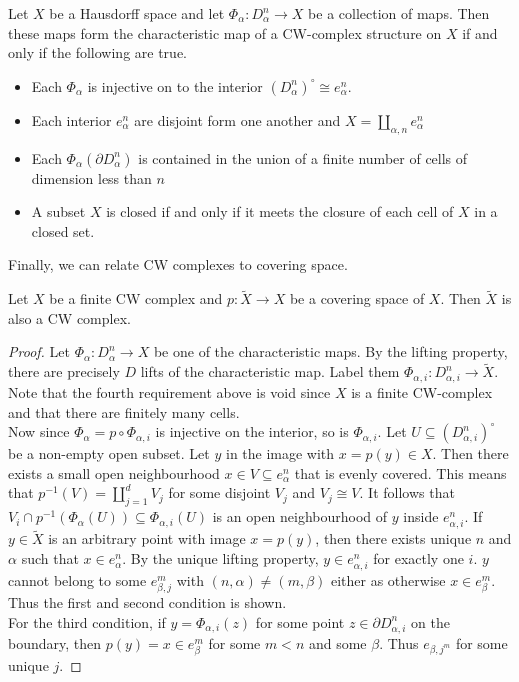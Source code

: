 \documentclass[a4paper]{article}
\begin{document}
\begin{thm}{}{} Let $X$ be a Hausdorff space and let $\Phi_\alpha:D_\alpha^n\to X$ be a collection of maps. Then these maps form the characteristic map of a CW-complex structure on $X$ if and only if the following are true. 
\begin{itemize}
\item Each $\Phi_\alpha$ is injective on to the interior $(D_\alpha^n)^\circ\cong e_{\alpha}^n$. 
\item Each interior $e_\alpha^n$ are disjoint form one another and $X=\coprod_{\alpha,n}e_{\alpha}^n$
\item Each $\Phi_\alpha(\partial D_\alpha^n)$ is contained in the union of a finite number of cells of dimension less than $n$
\item A subset $X$ is closed if and only if it meets the closure of each cell of $X$ in a closed set. 
\end{itemize}
\end{thm}

Finally, we can relate CW complexes to covering space. 

\begin{prp}{}{} Let $X$ be a finite CW complex and $p:\widetilde{X}\to X$ be a covering space of $X$. Then $\widetilde{X}$ is also a CW complex. 
\begin{proof}
Let $\Phi_\alpha:D_\alpha^n\to X$ be one of the characteristic maps. By the lifting property, there are precisely $D$ lifts of the characteristic map. Label them $\Phi_{\alpha,i}:D_{\alpha,i}^n\to\widetilde{X}$. Note that the fourth requirement above is void since $X$ is a finite CW-complex and that there are finitely many cells. \\

Now since $\Phi_{\alpha}=p\circ\Phi_{\alpha,i}$ is injective on the interior, so is $\Phi_{\alpha,i}$. Let $U\subseteq(D_{\alpha,i}^n)^\circ$ be a non-empty open subset. Let $y$ in the image with $x=p(y)\in X$. Then there exists a small open neighbourhood $x\in V\subseteq e_\alpha^n$ that is evenly covered. This means that $p^{-1}(V)=\coprod_{j=1}^dV_j$ for some disjoint $V_j$ and $V_j\cong V$. It follows that $V_i\cap p^{-1}(\Phi_\alpha(U))\subseteq\Phi_{\alpha,i}(U)$ is an open neighbourhood of $y$ inside $e_{\alpha,i}^n$. If $y\in\widetilde{X}$ is an arbitrary point with image $x=p(y)$, then there exists unique $n$ and $\alpha$ such that $x\in e_{\alpha}^n$. By the unique lifting property, $y\in e_{\alpha,i}^n$ for exactly one $i$. $y$ cannot belong to some $e_{\beta,j}^m$ with $(n,\alpha)\neq(m,\beta)$ either as otherwise $x\in e_\beta^m$. Thus the first and second condition is shown. \\

For the third condition, if $y=\Phi_{\alpha,i}(z)$ for some point $z\in\partial D_{\alpha,i}^n$ on the boundary, then $p(y)=x\in e_\beta^m$ for some $m<n$ and some $\beta$. Thus $e_{\beta,j^m}$ for some unique $j$. 
\end{proof}
\end{prp}
\end{document}

